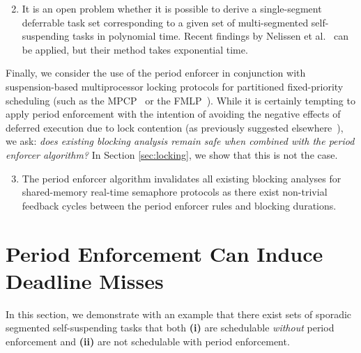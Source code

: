 \begin{enumerate}
\setcounter{enumi}{1}
	\item It is an open problem whether it is possible to derive a single-segment deferrable task set corresponding to a given set of  multi-segmented self-suspending tasks in polynomial time. Recent findings by Nelissen et al.~\cite{ecrts15nelissen} can be applied, but their method takes exponential time.
\end{enumerate}

Finally, we consider the use of the period enforcer in conjunction with suspension-based multiprocessor locking protocols for partitioned fixed-priority scheduling (such as the MPCP~\cite{LNR:09,Ra:90} or the FMLP~\cite{BLBA:07,BA:08}). While it is certainly tempting to apply period enforcement with the intention of avoiding the negative effects of deferred execution due to lock contention (as previously suggested elsewhere~\cite{Raj:91,Lak:11,LNR:09}), we ask: \emph{does existing blocking analysis remain safe when combined with the period enforcer algorithm?} In Section \ref{sec:locking}, we show that this is not the case.

\begin{enumerate}
\setcounter{enumi}{2}
	\item The period enforcer algorithm invalidates all existing blocking analyses for shared-memory real-time semaphore protocols as there exist non-trivial feedback cycles between the period enforcer rules and blocking durations.
\end{enumerate}



\section{Period Enforcement Can Induce Deadline Misses}
\label{sec:unschedulable}

In this section, we demonstrate with an example that there exist sets of sporadic  segmented self-suspending tasks that both \textbf{(i)} are schedulable \emph{without} period enforcement and \textbf{(ii)} are not schedulable with period enforcement.

